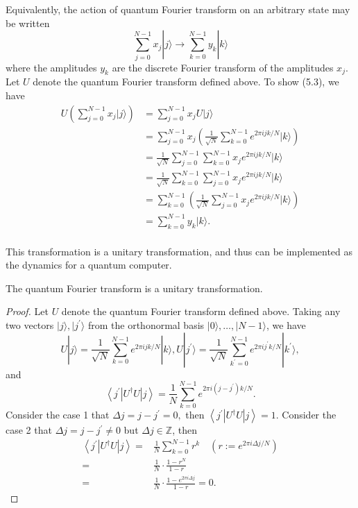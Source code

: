 Equivalently, the action of quantum Fourier transform on an arbitrary state may be written
\begin{equation*}
\sum_{j=0}^{N-1} x_{j}|j\rangle \longrightarrow \sum_{k=0}^{N-1} y_{k}|k\rangle \tag{5.3}
\end{equation*}
where the amplitudes $y_{k}$ are the discrete Fourier transform of the amplitudes $x_{j}$.  Let $U$ denote the quantum Fourier transform defined above. To show (5.3), we have
\begin{align*}
    U(\sum_{j=0}^{N-1} x_{j}|j\rangle) &= \sum_{j=0}^{N-1} x_{j} U|j\rangle \\
    &= \sum_{j=0}^{N-1} x_{j} \left(\frac{1}{\sqrt{N}} \sum_{k=0}^{N-1} e^{2 \pi i j k / N}|k\rangle \right) \\
    &= \frac{1}{\sqrt{N}} \sum_{j=0}^{N-1}  \sum_{k=0}^{N-1} x_{j} e^{2 \pi i j k / N}|k\rangle \\
    &= \frac{1}{\sqrt{N}} \sum_{k=0}^{N-1} \sum_{j=0}^{N-1}   x_{j} e^{2 \pi i j k / N}|k\rangle \\
    &= \sum_{k=0}^{N-1} \left(\frac{1}{\sqrt{N}}  \sum_{j=0}^{N-1}   x_{j} e^{2 \pi i j k / N}|k\rangle \right)\\
    &= \sum_{k=0}^{N-1} y_{k}|k\rangle. \\
\end{align*}

This transformation is a unitary transformation, and thus can be implemented as the dynamics for a quantum computer. 

\begin{theorem}
    The quantum Fourier transform is a unitary transformation.
\end{theorem}

\begin{proof}
Let $U$ denote the quantum Fourier transform defined above. Taking any two vectors $|j\rangle, |j^{\prime}\rangle$ from the orthonormal basis $|0\rangle, \ldots,|N-1\rangle$, we have 
$$
U|j\rangle=\frac{1}{\sqrt{N}} \sum_{k=0}^{N-1} e^{2 \pi i j k / N}|k\rangle,
U|j^{\prime}\rangle=\frac{1}{\sqrt{N}} \sum_{k^{\prime}=0}^{N-1} e^{2 \pi i j^{\prime} k / N}|k^{\prime}\rangle,
$$
and
$$
\left\langle j^{\prime}\left|U^{\dagger} U\right| j\right\rangle=\frac{1}{N} \sum_{k=0}^{N-1} e^{2 \pi i\left(j-j^{\prime}\right) k / N}.
$$
Consider the case 1 that $\Delta j=j-j^{\prime}=0,$ then $\left\langle j^{\prime}\left|U^{\dagger} U\right| j\right\rangle=1.$
Consider the case 2 that $\Delta j=j-j^{\prime} \neq 0$ but $\Delta j  \in \mathbb{Z}$, then
\begin{align}
\left\langle j^{\prime}\left|U^{\dagger} U\right| j\right\rangle = & \frac{1}{N} \sum_{k=0}^{N-1} r^k \quad \left(r:=e^{2 \pi i \Delta j / N}\right) \\
= & \frac{1}{N} \cdot \frac{1-r^N}{1-r} \\ 
= & \frac{1}{N} \cdot  \frac{1-e^{2 \pi i \Delta j}}{1-r}=0.
\end{align}
\end{proof}

